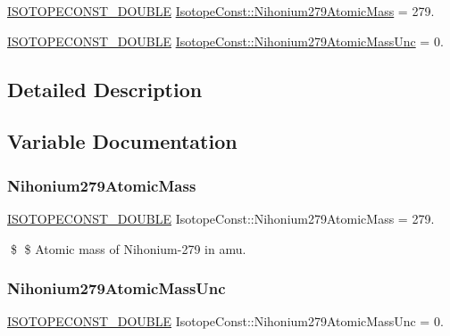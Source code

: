 \begin{DoxyCompactItemize}
\item 
\mbox{\hyperlink{group___isotope_const-_macros_ga8f45a7272ce02c0b4c65c44636ed719a}{I\+S\+O\+T\+O\+P\+E\+C\+O\+N\+S\+T\+\_\+\+D\+O\+U\+B\+LE}} \mbox{\hyperlink{group___isotope_const-_nihonium-_nh279_gacc252b401d4278f452567f1ff831fe30}{Isotope\+Const\+::\+Nihonium279\+Atomic\+Mass}} = 279.
\item 
\mbox{\hyperlink{group___isotope_const-_macros_ga8f45a7272ce02c0b4c65c44636ed719a}{I\+S\+O\+T\+O\+P\+E\+C\+O\+N\+S\+T\+\_\+\+D\+O\+U\+B\+LE}} \mbox{\hyperlink{group___isotope_const-_nihonium-_nh279_ga45f138d3ca10de4782713f8d203163aa}{Isotope\+Const\+::\+Nihonium279\+Atomic\+Mass\+Unc}} = 0.
\end{DoxyCompactItemize}


\subsection{Detailed Description}


\subsection{Variable Documentation}
\mbox{\label{group___isotope_const-_nihonium-_nh279_gacc252b401d4278f452567f1ff831fe30}} 
\subsubsection{\texorpdfstring{Nihonium279\+Atomic\+Mass}{Nihonium279AtomicMass}}
{\footnotesize\ttfamily \mbox{\hyperlink{group___isotope_const-_macros_ga8f45a7272ce02c0b4c65c44636ed719a}{I\+S\+O\+T\+O\+P\+E\+C\+O\+N\+S\+T\+\_\+\+D\+O\+U\+B\+LE}} Isotope\+Const\+::\+Nihonium279\+Atomic\+Mass = 279.}

\$ \$ Atomic mass of Nihonium-\/279 in amu. \mbox{\label{group___isotope_const-_nihonium-_nh279_ga45f138d3ca10de4782713f8d203163aa}} 
\subsubsection{\texorpdfstring{Nihonium279\+Atomic\+Mass\+Unc}{Nihonium279AtomicMassUnc}}
{\footnotesize\ttfamily \mbox{\hyperlink{group___isotope_const-_macros_ga8f45a7272ce02c0b4c65c44636ed719a}{I\+S\+O\+T\+O\+P\+E\+C\+O\+N\+S\+T\+\_\+\+D\+O\+U\+B\+LE}} Isotope\+Const\+::\+Nihonium279\+Atomic\+Mass\+Unc = 0.}

